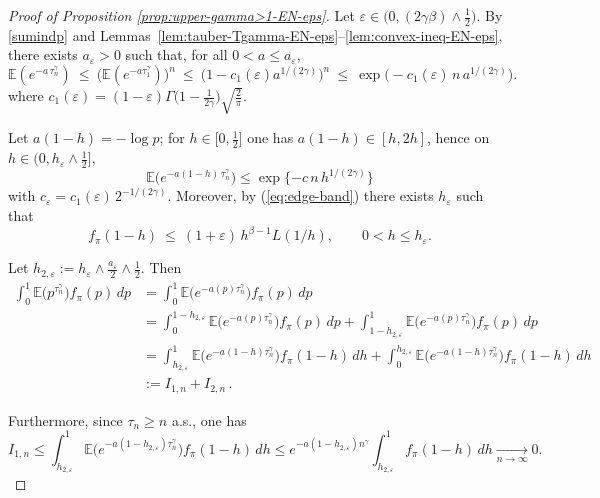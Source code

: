 \documentclass[10pt,a4paper]{amsart}
\newcommand{\EE}{\mathbb{E}}
\begin{document}
\begin{proof}[Proof of Proposition \ref{prop:upper-gamma>1-EN-eps}]
    Let \(\varepsilon\in \bigl(0,(2\gamma\beta)\wedge\tfrac{1}{2}\bigr)\). By \eqref{sumindp} and Lemmas~\ref{lem:tauber-Tgamma-EN-eps}–\ref{lem:convex-ineq-EN-eps},
there exists $a_\varepsilon>0$ such that, for all $0<a\le a_\varepsilon$,
\[
\EE(e^{-a\,\tau_n^\gamma})\ \le\ \big(\EE(e^{-a \tau_1^\gamma})\big)^n\ \le\ \big(1-c_1(\varepsilon) a^{1/(2\gamma)}\big)^n
\ \le\ \exp\big(-c_1(\varepsilon)\,n\,a^{1/(2\gamma)}\big).
\]
where \(c_1(\varepsilon)=(1-\varepsilon)\Gamma\!\bigl(1-\tfrac{1}{2\gamma}\bigr)\sqrt{\tfrac{2}{\pi}}\). 

Let \(a(1-h)=-\log p\); for \(h\in \bigl[0,\tfrac{1}{2}\bigr]\) one has \(a(1-h)\in [h,2h]\), hence on \(h\in\bigl(0,h_\varepsilon\wedge\tfrac{1}{2}\bigr]\),
\begin{equation}\label{gac1}
\EE\!\big(e^{-a(1-h)\,\tau_n^\gamma}\big)\le \exp\{-c\,n\, h^{1/(2\gamma)}\} 
\end{equation}
with \(c_{\varepsilon}=c_1(\varepsilon)\,2^{-1/(2\gamma)}\). Moreover, by (\ref{eq:edge-band}) there exists \(h_{\varepsilon}\) such that 
\begin{equation}\label{gac2}
f_\pi(1-h)\ \le\
(1+\varepsilon)\,h^{\beta-1}L(1/h),\qquad 0<h\le h_\varepsilon .
\end{equation}

Let \(h_{2,\varepsilon}:=h_{\varepsilon}\wedge\tfrac{a_{\varepsilon}}{2}\wedge\tfrac{1}{2}\). Then
\begin{equation}
    \begin{split}
        \int_{0}^{1}\EE\!\big(p^{\tau_n^{\gamma}}\big)f_{\pi}(p)\,dp
        &=\int_{0}^{1}\EE\!\big(e^{-a(p)\tau_n^{\gamma}}\big)f_{\pi}(p)\,dp\\
        &=\int_{0}^{1-h_{2,\varepsilon}}\EE\!\big(e^{-a(p)\tau_n^{\gamma}}\big)f_{\pi}(p)\,dp+\int_{1-h_{2,\varepsilon}}^{1}\EE\!\big(e^{-a(p)\tau_n^{\gamma}}\big)f_{\pi}(p)\,dp\\
        &=\int_{h_{2,\varepsilon}}^{1}\EE\!\big(e^{-a(1-h)\tau_n^{\gamma}}\big)f_{\pi}(1-h)\,dh+\int_{0}^{h_{2,\varepsilon}}\EE\!\big(e^{-a(1-h)\tau_n^{\gamma}}\big)f_{\pi}(1-h)\,dh\\
        &:=I_{1,n}+I_{2,n}\,.
    \end{split}
\end{equation}

Furthermore, since \(\tau_{n}\ge n\) a.s., one has
\begin{equation}\label{limI_1}
        I_{1,n}\le \int_{h_{2,\varepsilon}}^{1}\EE\!\big(e^{-a(1-h_{2,\varepsilon})\tau_n^{\gamma}}\big)f_{\pi}(1-h)\,dh
        \le e^{-a(1-h_{2,\varepsilon})n^{\gamma}}\int_{h_{2,\varepsilon}}^{1}f_{\pi}(1-h)\,dh
        \xrightarrow[n\to\infty]{}0.
\end{equation}


\end{proof}
\end{document}
